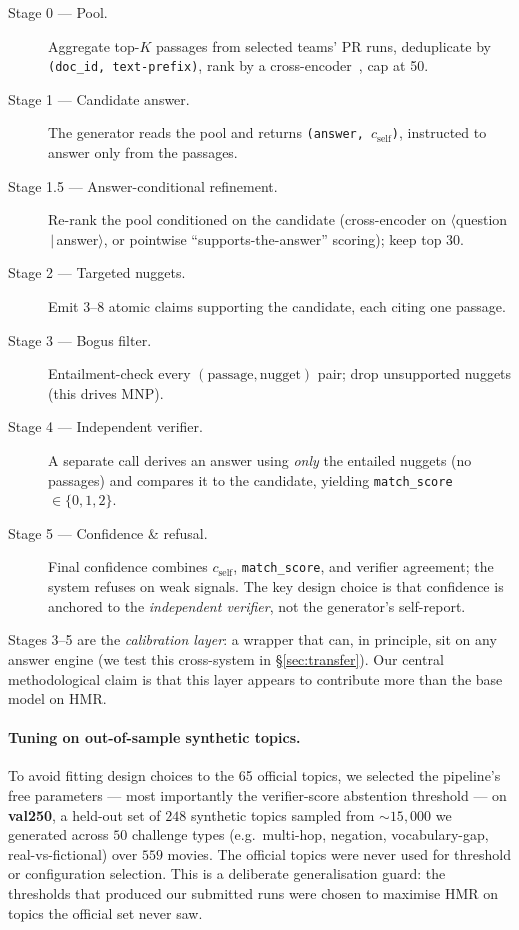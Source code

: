 \documentclass[sigconf,nonacm]{acmart}
\newcommand{\HMR}{\textsc{HMR}}
\newcommand{\MNP}{\textsc{MNP}}
\begin{document}
\begin{description}
  \item[Stage 0 --- Pool.] Aggregate top-$K$ passages from selected teams' PR runs,
    deduplicate by \texttt{(doc\_id, text-prefix)}, rank by a cross-encoder~\cite{monobert},
    cap at 50.
  \item[Stage 1 --- Candidate answer.] The generator reads the pool and returns
    \texttt{(answer, $c_{\text{self}}$)}, instructed to answer only from the passages.
  \item[Stage 1.5 --- Answer-conditional refinement.] Re-rank the pool conditioned on the
    candidate (cross-encoder on $\langle$question$\,|\,$answer$\rangle$, or pointwise
    ``supports-the-answer'' scoring); keep top 30.
  \item[Stage 2 --- Targeted nuggets.] Emit 3--8 atomic claims supporting the candidate,
    each citing one passage.
  \item[Stage 3 --- Bogus filter.] Entailment-check every $(\text{passage},\text{nugget})$
    pair; drop unsupported nuggets (this drives \MNP).
  \item[Stage 4 --- Independent verifier.] A separate call derives an answer using
    \emph{only} the entailed nuggets (no passages) and compares it to the candidate,
    yielding \texttt{match\_score}$\in\{0,1,2\}$.
  \item[Stage 5 --- Confidence \& refusal.] Final confidence combines $c_{\text{self}}$,
    \texttt{match\_score}, and verifier agreement; the system refuses on weak signals. The
    key design choice is that confidence is anchored to the \emph{independent verifier},
    not the generator's self-report.
\end{description}

Stages 3--5 are the \emph{calibration layer}: a wrapper that can, in principle, sit on any
answer engine (we test this cross-system in \S\ref{sec:transfer}). Our central methodological claim is that this layer appears to contribute more than the
base model on \HMR.

\paragraph{Tuning on out-of-sample synthetic topics.} To avoid fitting design choices to
the 65 official topics, we selected the pipeline's free parameters --- most importantly the
verifier-score abstention threshold --- on \textbf{val250}, a held-out set of $248$
synthetic topics sampled from $\sim\!15{,}000$ we generated across $50$ challenge types
(e.g.\ multi-hop, negation, vocabulary-gap, real-vs-fictional) over $559$ movies. The
official topics were never used for threshold or configuration selection. This is a
deliberate generalisation guard: the thresholds that produced our submitted runs were
chosen to maximise \HMR{} on topics the official set never saw.
\end{document}

